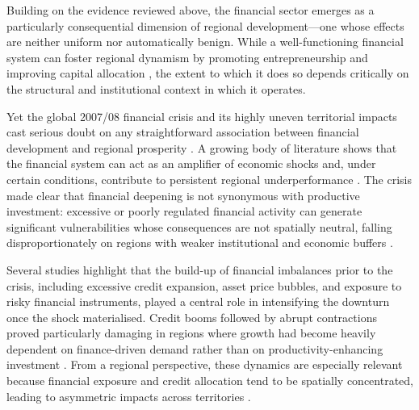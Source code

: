 \documentclass[a4paper,11pt,oneside]{article}
\begin{document}
Building on the evidence reviewed above, the financial sector emerges as a particularly consequential dimension of regional development---one whose effects are neither uniform nor automatically benign. While a well-functioning financial system can foster regional dynamism by promoting entrepreneurship and improving capital allocation \citep{levine2005finance}, the extent to which it does so depends critically on the structural and institutional context in which it operates.




Yet the global 2007/08 financial crisis and its highly uneven territorial impacts cast serious doubt on any straightforward association between financial development and regional prosperity \citep{libich2022hero}. A growing body of literature shows that the financial system can act as an amplifier of economic shocks and, under certain conditions, contribute to persistent regional underperformance \citep{gorton2010regulating,schularick2012credit,borio2014financial}. The crisis made clear that financial deepening is not synonymous with productive investment: excessive or poorly regulated financial activity can generate significant vulnerabilities whose consequences are not spatially neutral, falling disproportionately on regions with weaker institutional and economic buffers \citep{brunnermeier2013maturity,martin2011local}.




Several studies highlight that the build-up of financial imbalances prior to the crisis, including excessive credit expansion, asset price bubbles, and exposure to risky financial instruments, played a central role in intensifying the downturn once the shock materialised. Credit booms followed by abrupt contractions proved particularly damaging in regions where growth had become heavily dependent on finance-driven demand rather than on productivity-enhancing investment \citep{benediktsdottir2011lessons}. From a regional perspective, these dynamics are especially relevant because financial exposure and credit allocation tend to be spatially concentrated, leading to asymmetric impacts across territories \citep{klagge2005decentralized,guiso2009does,martin2011local,crescenzi2011innovation}.
\end{document}
